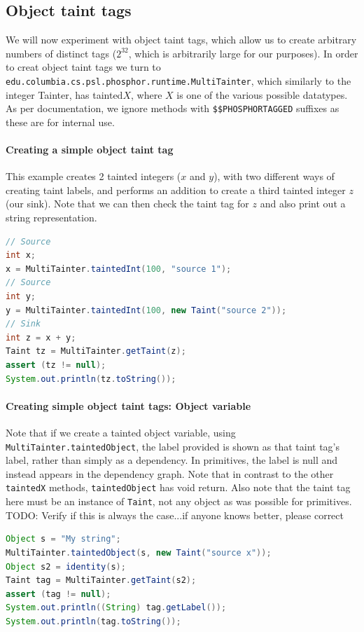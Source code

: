 \documentclass[a4paper]{article}
\newcommand{\todo}[1]{{\color{red}TODO: #1\\}}
\begin{document}
\subsection{Object taint tags}
\label{sec:multitaint}
We will now experiment with object taint tags, which allow us to create arbitrary numbers of distinct tags ($2^{32}$, which is arbitrarily large for our purposes). In order to creat object taint tags we turn to 
\verb|edu.columbia.cs.psl.phosphor.runtime.MultiTainter|, which similarly to the integer Tainter, has tainted$X$, where
$X$ is one of the various possible datatypes. As per documentation, we ignore methods
with \verb|$$PHOSPHORTAGGED| suffixes as these are for internal use.

\paragraph{Creating a simple object taint tag}
This example creates 2 tainted integers ($x$ and $y$), with two different ways of creating taint labels, and performs an addition
to create a third tainted integer $z$ (our sink). Note that we can then check the taint tag for $z$ and also print out
a string representation.

\begin{lstlisting}[language=java]
// Source
int x;
x = MultiTainter.taintedInt(100, "source 1");
// Source
int y;
y = MultiTainter.taintedInt(100, new Taint("source 2"));
// Sink
int z = x + y;
Taint tz = MultiTainter.getTaint(z);
assert (tz != null);
System.out.println(tz.toString());
\end{lstlisting}

\paragraph{Creating simple object taint tags: Object variable}
Note that if we create a tainted object variable, using \verb|MultiTainter.taintedObject|, the label provided is
shown as that taint tag's label, rather than simply as a dependency. In primitives, the label is null and instead
appears in the dependency graph. Note that in contrast to the other \verb|taintedX| methods, \verb|taintedObject| has
void return. Also note that the taint tag here must be an instance of \verb|Taint|, not any object as was possible
for primitives.
\todo{Verify if this is always the case...if anyone knows better, please correct}

\begin{lstlisting}[language=java]
Object s = "My string";
MultiTainter.taintedObject(s, new Taint("source x"));
Object s2 = identity(s);
Taint tag = MultiTainter.getTaint(s2);
assert (tag != null);
System.out.println((String) tag.getLabel());
System.out.println(tag.toString());
\end{lstlisting}
\end{document}
